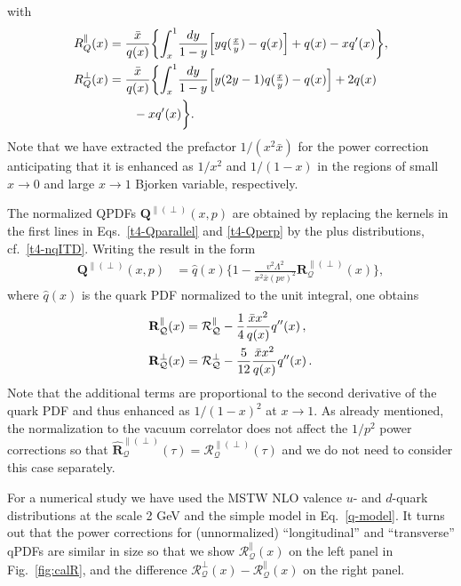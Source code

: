 \documentclass[aps,prd,twocolumn,a4paper,superscriptaddress,10pt,showpacs,notitlepage,floatfix]{revtex4-1}
\newcommand{\cR}{\mathcal{R}}
\newcommand{\cQ}{\mathcal{Q}}
\newcommand{\bR}{\mathbf{R}}
\newcommand{\bQ}{\mathbf{Q}}
\begin{document}
with
\begin{align}
 R^\parallel_Q(x) &= 
\frac{\bar x }{q(x)} \biggl\{ \int_{x}^1\!\frac{dy}{1-y} \Big[y q(\tfrac{x}{y}) - q(x)\Big] + q(x)-x q'(x)\biggr\}, 
\notag\\
 R^\perp_Q(x) &= 
\frac{\bar x }{q(x)} \biggl\{ \int_{x}^1\!\frac{dy}{1-y} \Big[y (2y-1) q(\tfrac{x}{y}) - q(x)\Big] + 2q(x)  
\notag\\&\qquad - x q'(x) \biggr\}.
\end{align}
%
Note that we have extracted the prefactor $1/(x^2\bar x)$ for the power correction anticipating that it is 
enhanced as $1/x^2$ and $1/(1-x)$ in the regions of small $x\to 0$ and large $x\to 1$ Bjorken variable, respectively.

The normalized QPDFs $\bQ^{\parallel(\perp)}(x,p)$ are obtained by replacing the kernels in the first lines
in Eqs.~\eqref{t4-Qparallel} and \eqref{t4-Qperp} by the plus distributions, cf.~\eqref{t4-nqITD}.
Writing the result in the form
\begin{align}
\label{bR}
   \bQ^{\parallel(\perp)}(x,p) &=  \hat q(x) \biggl\{1 - \frac{v^2 \Lambda^2}{ x^2\bar x  (pv)^2}\bR^{\parallel(\perp)}_\cQ(x) \biggr\}, 
\end{align}
where $\hat q(x)$ is the quark PDF normalized to the unit integral, one obtains
\begin{align}
 \bR^\parallel_\cQ(x) &= \cR^\parallel_\cQ - \frac14 \frac{\bar x x^2 }{q(x)}  q''(x)\,, %
\notag\\
 \bR^\perp_\cQ(x) &= \cR^\perp_\cQ - \frac5{12} \frac{\bar x x^2 }{q(x)}  q''(x)\,.    %
\end{align}
Note that the additional terms are proportional to the second derivative of the quark PDF and thus enhanced as $1/(1-x)^2$ at $x\to 1$.
As already mentioned, the normalization to the vacuum correlator does not affect the $1/p^2$ power corrections so that 
$\widehat{\bR}_{\cQ}^{\parallel(\perp)}(\tau) = \cR_{\cQ}^{\parallel(\perp)}(\tau)$ and we do not need to consider this case separately.

For a numerical study we have used the MSTW NLO valence $u$- and $d$-quark distributions \cite{Martin:2009iq} at the scale 2 GeV and the simple model
in Eq.~\eqref{q-model}. It turns out that the power corrections for (unnormalized) ``longitudinal'' and ``transverse'' qPDFs 
are similar in size so that we show $\cR^\parallel_\cQ(x)$ on the left panel in Fig.~\ref{fig:calR}, and the difference 
$\cR^\perp_\cQ(x) - \cR^\parallel_\cQ(x)$ on the right panel.
\end{document}
